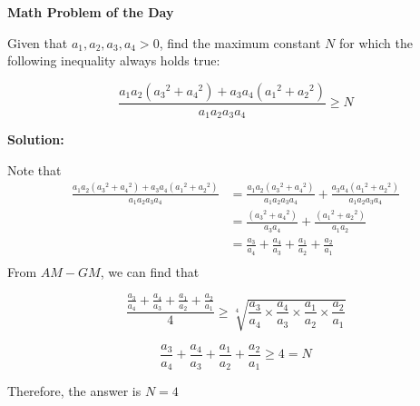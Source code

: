 \documentclass[12pt]{article}
\begin{document}
\centering
		\large{\textbf{Math Problem of the Day}}
	\justify

Given that $a_1, a_2, a_3, a_4 > 0$, find the maximum constant $N$ for which the following inequality always holds true:

\[ \frac{a_1a_2\left({a_3}^2+{a_4}^2\right) +a_3a_4\left({a_1}^2+{a_2}^2 \right)}{a_1a_2a_3a_4} \geq N \]

\bigskip
	\noindent
		\textbf{Solution:}

\noindent
Note that 
\begin{align*}
	 \frac{a_1a_2\left({a_3}^2+{a_4}^2\right) +a_3a_4\left({a_1}^2+{a_2}^2 \right)}					{a_1a_2a_3a_4} &= \frac{a_1a_2\left({a_3}^2+{a_4}^2\right)}{a_1a_2a_3a_4} + 
	\frac{a_3a_4\left({a_1}^2+{a_2}^2 \right)}{a_1a_2a_3a_4} \\	
	&= \frac{\left( {a_3}^2 + {a_4}^2 \right)}{a_3a_4} + \frac{\left( {a_1}^2 + {a_2}^2 \right)}{a_1a_2} \\
   & = \frac{a_3}{a_4} + \frac{a_4}{a_3} + \frac{a_1}{a_2} + \frac{a_2}{a_1} \\ 
\end{align*}
From $AM-GM$, we can find that

\[ \frac{\frac{a_3}{a_4} + \frac{a_4}{a_3} + \frac{a_1}{a_2} + \frac{a_2}{a_1} }{4} \geq \sqrt[4]{\frac{a_3}{a_4} \times \frac{a_4}{a_3} \times \frac{a_1}{a_2} \times \frac{a_2}{a_1}} \]

\[  \frac{a_3}{a_4} + \frac{a_4}{a_3} + \frac{a_1}{a_2} + \frac{a_2}{a_1} \geq 4 = N \]

\center
Therefore, the answer is \textbf{$N = 4$}
\end{document}
